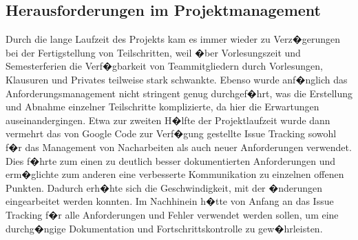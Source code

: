 \documentclass[a4paper,12pt]{scrartcl}
\begin{document}
\subsection{Herausforderungen im Projektmanagement}

Durch die lange Laufzeit des Projekts kam es immer wieder zu Verz�gerungen bei der Fertigstellung von Teilschritten, weil �ber Vorlesungszeit und Semesterferien die Verf�gbarkeit von Teammitgliedern durch Vorlesungen, Klausuren und Privates teilweise stark schwankte. Ebenso wurde anf�nglich das Anforderungsmanagement nicht stringent genug durchgef�hrt, was die Erstellung und Abnahme einzelner Teilschritte komplizierte, da hier die Erwartungen auseinandergingen. Etwa zur zweiten H�lfte der Projektlaufzeit wurde dann vermehrt das von Google Code zur Verf�gung gestellte Issue Tracking sowohl f�r das Management von Nacharbeiten als auch neuer Anforderungen verwendet. Dies f�hrte zum einen zu deutlich besser dokumentierten Anforderungen und erm�glichte zum anderen eine verbesserte Kommunikation zu einzelnen offenen Punkten. Dadurch erh�hte sich die Geschwindigkeit, mit der �nderungen eingearbeitet werden konnten. Im Nachhinein h�tte von Anfang an das Issue Tracking f�r alle Anforderungen und Fehler verwendet werden sollen, um eine durchg�ngige Dokumentation und Fortschrittskontrolle zu gew�hrleisten.
\end{document}

